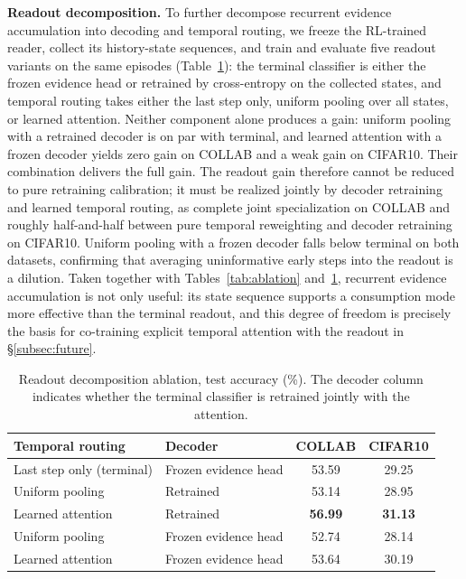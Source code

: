 \documentclass{article}
\begin{document}
\textbf{Readout decomposition.} To further decompose recurrent evidence accumulation into decoding and temporal routing, we freeze the RL-trained reader, collect its history-state sequences, and train and evaluate five readout variants on the same episodes (Table~\ref{tab:readout}): the terminal classifier is either the frozen evidence head or retrained by cross-entropy on the collected states, and temporal routing takes either the last step only, uniform pooling over all states, or learned attention. Neither component alone produces a gain: uniform pooling with a retrained decoder is on par with terminal, and learned attention with a frozen decoder yields zero gain on COLLAB and a weak gain on CIFAR10. Their combination delivers the full gain. The readout gain therefore cannot be reduced to pure retraining calibration; it must be realized jointly by decoder retraining and learned temporal routing, as complete joint specialization on COLLAB and roughly half-and-half between pure temporal reweighting and decoder retraining on CIFAR10. Uniform pooling with a frozen decoder falls below terminal on both datasets, confirming that averaging uninformative early steps into the readout is a dilution. Taken together with Tables~\ref{tab:ablation} and~\ref{tab:readout}, recurrent evidence accumulation is not only useful: its state sequence supports a consumption mode more effective than the terminal readout, and this degree of freedom is precisely the basis for co-training explicit temporal attention with the readout in \S\ref{subsec:future}.

\begin{table}[!htb]
\centering
\caption{Readout decomposition ablation, test accuracy (\%). The decoder column indicates whether the terminal classifier is retrained jointly with the attention.}
\label{tab:readout}
\begin{tabular}{llcc}
\toprule
Temporal routing & Decoder & COLLAB & CIFAR10 \\
\midrule
Last step only (terminal) & Frozen evidence head & 53.59 & 29.25 \\
Uniform pooling & Retrained & 53.14 & 28.95 \\
Learned attention & Retrained & \textbf{56.99} & \textbf{31.13} \\
Uniform pooling & Frozen evidence head & 52.74 & 28.14 \\
Learned attention & Frozen evidence head & 53.64 & 30.19 \\
\bottomrule
\end{tabular}
\end{table}
\end{document}
